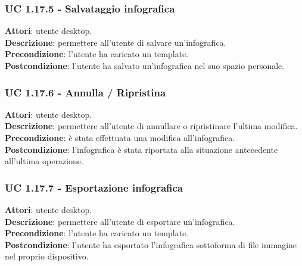\subsubsection{UC 1.17.5 - Salvataggio infografica}{
	\label{uc1.17.5}
	\textbf{Attori}: utente desktop. \\
	\textbf{Descrizione}: permettere all’utente di salvare un’infografica. \\
	\textbf{Precondizione}: l'utente ha caricato un template.	\\
	\textbf{Postcondizione}: l'utente ha salvato un’infografica nel suo spazio personale.	\\
	}
\subsubsection{UC 1.17.6 - Annulla / Ripristina}{
	\label{uc1.17.6}
	\textbf{Attori}: utente desktop. \\
	\textbf{Descrizione}: permettere all’utente di annullare o ripristinare l'ultima modifica. \\
	\textbf{Precondizione}: è stata effettuata una modifica all'infografica.	\\
	\textbf{Postcondizione}: l'infografica è stata riportata alla situazione antecedente all'ultima operazione.	\\
	}
\subsubsection{UC 1.17.7 - Esportazione infografica}{
	\label{uc1.17.7.7}
	\textbf{Attori}: utente desktop. \\
	\textbf{Descrizione}: permettere all’utente di esportare un’infografica. \\
	\textbf{Precondizione}: l'utente ha caricato un template.	\\
	\textbf{Postcondizione}: l'utente ha esportato l'infografica sottoforma di file immagine nel proprio dispositivo.	\\
	}